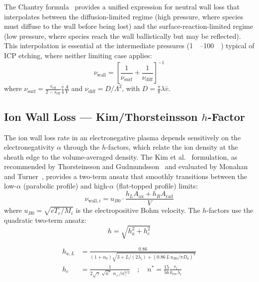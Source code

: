 \documentclass[11pt,a4paper]{report}
\newcommand{\Te}{T_e}
\begin{document}
The Chantry formula~\cite{Chantry1987} provides a unified expression for neutral wall loss that interpolates between the diffusion-limited regime (high pressure, where species must diffuse to the wall before being lost) and the surface-reaction-limited regime (low pressure, where species reach the wall ballistically but may be reflected).  This interpolation is essential at the intermediate pressures (\SIrange{1}{100}{\milli\torr}) typical of ICP etching, where neither limiting case applies:
\begin{equation}
\boxed{\nu_\text{wall} = \left[\frac{1}{\nu_\text{surf}} + \frac{1}{\nu_\text{diff}}\right]^{-1}}
\label{eq:pure_chantry}
\end{equation}
where $\nu_\text{surf} = \frac{s_\text{eff}}{2-s_\text{eff}}\frac{\bar{v}}{4}\frac{A}{V}$ and $\nu_\text{diff} = D/\Lambda^2$, with $D = \frac{\pi}{8}\lambda\bar{v}$.

\subsection{Ion Wall Loss --- Kim/Thorsteinsson $h$-Factor}
\label{sec:pure_hfactor}

The ion wall loss rate in an electronegative plasma depends sensitively on the electronegativity $\alpha$ through the $h$-factors, which relate the ion density at the sheath edge to the volume-averaged density.  The Kim et al.~\cite{Kim2006} formulation, as recommended by Thorsteinsson and Gudmundsson~\cite{Thorsteinsson2010} and evaluated by Monahan and Turner~\cite{Monahan2008}, provides a two-term ansatz that smoothly transitions between the low-$\alpha$ (parabolic profile) and high-$\alpha$ (flat-topped profile) limits:
\begin{equation}
\boxed{\nu_{\text{wall},i} = u_{B0} \cdot \frac{h_L A_\text{ax} + h_R A_\text{rad}}{V}}
\label{eq:pure_ionwall}
\end{equation}
where $u_{B0} = \sqrt{e\Te/M_i}$ is the electropositive Bohm velocity.  The $h$-factors use the quadratic two-term ansatz:
\begin{equation}
\boxed{h = \sqrt{h_a^2 + h_c^2}}
\label{eq:pure_hfactor}
\end{equation}

\begin{align}
h_{a,L} &= \frac{0.86}{(1+\alpha_0)\sqrt{3 + L/(2\lambda_i) + (0.86\,L\,u_{B0}/\pi D_a)^2}} \label{eq:pure_ha}\\
h_c &= \frac{1}{2\sqrt{\gamma}\;\sqrt{n^*}\;n_+/n_-^{3/2}} \quad;\quad n^* = \frac{15}{56}\frac{v_i}{k_\text{rec}\lambda_i} \label{eq:pure_hc}
\end{align}
\end{document}
